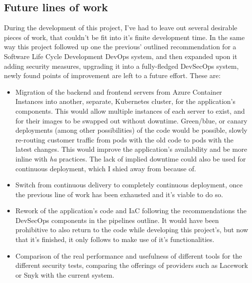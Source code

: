\documentclass[11pt]{article}
\begin{document}
\begin{flushleft}
\clearpage
\section{Future lines of work}
During the development of this project, I've had to leave out several desirable pieces of work, that couldn't be fit into it's finite development time. In the same way this project followed up one the previous' outlined recommendation for a Software Life Cycle Development DevOps system, and then expanded upon it adding security measures, upgrading it into a fully-fledged DevSecOps system, newly found points of improvement are left to a future effort. These are:
\linebreak

    \begin{itemize}
        \itemsep0em 
        \item Migration of the backend and frontend servers from Azure Container Instances into another, separate, Kubernetes cluster, for the application's components. This would allow multiple instances of each server to exist, and for their images to be swapped out without downtime. Green/blue, or canary deployments (among other possibilities) of the code would be possible, slowly re-routing customer traffic from pods with the old code to pods with the latest changes. This would improve the application's availability and be more inline with \textit{\acrshort{ha}} practices. The lack of implied downtime could also be used for continuous deployment, which I shied away from because of. 
        \linebreak

        \item Switch from continuous delivery to completely continuous deployment, once the previous line of work has been exhausted and it's viable to do so.
        \linebreak
        
        \item Rework of the application's code and IaC following the recommendations the DevSecOps components in the pipelines outline. It would have been prohibitive to also return to the code while developing this project's, but now that it's finished, it only follows to make use of it's functionalities.
        \linebreak

        \item Comparison of the real performance and usefulness of different tools for the different security tests, comparing the offerings of providers such as Lacework or Snyk with the current system.
        \linebreak
        

\end{itemize}
\end{flushleft}
\end{document}
